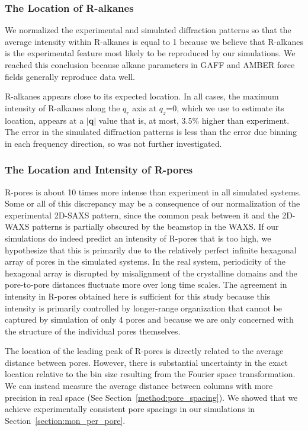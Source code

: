  \subsubsection{The Location of R-alkanes}\label{section:ralkanes}

  We normalized the experimental and simulated diffraction patterns so that the
  average intensity within R-alkanes is equal to 1 because we believe that
  R-alkanes is the experimental feature most likely to be reproduced by our
  simulations. We reached this conclusion because alkane parameters in GAFF and
  AMBER force fields generally reproduce data
  well.~\cite{wang_development_2004,caleman_force_2012} 

  R-alkanes appears close to its expected location. In all cases, the maximum
  intensity of R-alkanes along the $q_r$ axis at $q_z$=0, which we use to
  estimate its location, appears at a $|\mathbf{q}|$ value that is, at most,
  3.5\% higher than experiment. The error in the simulated diffraction patterns
  is less than the error due binning in each frequency direction, so was not
  further investigated. 

  \subsubsection{The Location and Intensity of R-pores}\label{section:rpores}
  
  R-pores is about 10 times more intense than experiment in all simulated
  systems. Some or all of this discrepancy may be a consequence of our
  normalization of the experimental 2D-SAXS pattern, since the common peak
  between it and the 2D-WAXS patterns is partially obscured by the beamstop in
  the WAXS. If our simulations do indeed predict an intensity of R-pores that is
  too high, we hypothesize that this is primarily due to the relatively perfect
  infinite hexagonal array of pores in the simulated systems. In the real system,
  periodicity of the hexagonal array is disrupted by misalignment of the
  crystalline domains and the pore-to-pore distances fluctuate more over long
  time scales. The agreement in intensity in R-pores obtained here is sufficient for this
  study because this intensity is primarily controlled by longer-range
  organization that cannot be captured by simulation of only 4 pores and because
  we are only concerned with the structure of the individual pores themselves. 
  
  The location of the leading peak of R-pores is directly related to the
  average distance between pores. However, there is substantial uncertainty in
  the exact location relative to the bin size resulting from the Fourier space
  transformation. We can instead measure the average distance between columns
  with more precision in real space (See Section~\ref{method:pore_spacing}). We
  showed that we achieve experimentally consistent pore spacings in our
  simulations in Section~\ref{section:mon_per_pore}. 

